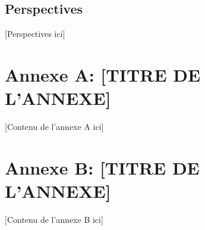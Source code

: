 \documentclass[12pt,a4paper,openany,oneside,draft]{report}
\begin{document}
\section{Perspectives}
[Perspectives ici]




\begin{appendices}
\chapter{Annexe A: [TITRE DE L'ANNEXE]}
[Contenu de l'annexe A ici]

\chapter{Annexe B: [TITRE DE L'ANNEXE]}
[Contenu de l'annexe B ici]
\end{appendices}
\end{document}
